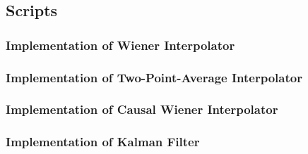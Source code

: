 \documentclass[11pt]{article}
\begin{document}
\appendix

\subsection*{Scripts}


\subsubsection*{Implementation of Wiener Interpolator}



\subsubsection*{Implementation of Two-Point-Average Interpolator}



\subsubsection*{Implementation of Causal Wiener Interpolator}



\subsubsection*{Implementation of Kalman Filter}
\end{document}
